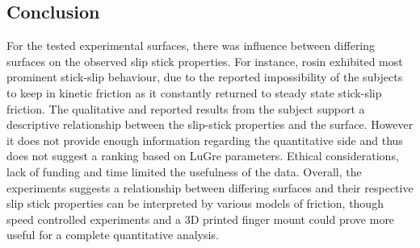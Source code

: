 \documentclass[12pt]{article}
\begin{document}
\subsection{Conclusion}

For the tested experimental surfaces, there was influence between differing surfaces on the observed slip stick properties. For instance, rosin exhibited most prominent stick-slip behaviour, due to the reported impossibility of the subjects to keep in kinetic friction as it constantly returned to steady state stick-slip friction. The qualitative and reported results from the subject support a descriptive relationship between the slip-stick properties and the surface. However it does not provide enough information regarding the quantitative side and thus does not suggest a ranking based on LuGre parameters. Ethical considerations, lack of funding and time limited the usefulness of the data. Overall, the experiments suggests a relationship between differing surfaces and their respective slip stick properties can be interpreted by various models of friction, though speed controlled experiments and a 3D printed finger mount could prove more useful for a complete quantitative analysis.




\pagebreak

\pagebreak
\printbibliography
\end{document}
